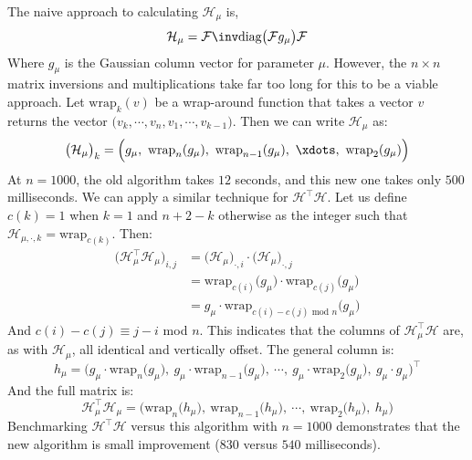 \documentclass{article}
\begin{document}
The naive approach to calculating $\mathcal H_\mu$ is,
$$\mathcal H_\mu=\mathcal F\inv\textrm{diag}\big(\mathcal Fg_\mu\big)\mathcal F$$
Where $g_\mu$ is the Gaussian column vector for parameter $\mu$. However, the $n\times n$ matrix inversions and multiplications take far too long for this to be a viable approach. Let $\textrm{wrap}_k(v)$ be a wrap-around function that takes a vector $v$ returns the vector $\big(v_k,\cdots,v_n,v_1,\cdots,v_{k-1}\big)$. Then we can write $\mathcal H_{\mu}$ as:
$$\big(\mathcal H_{\mu}\big)_k=\Big(g_\mu,\ \textrm{wrap}_n(g_\mu),\ \textrm{wrap}_{n-1}(g_\mu),\ \xdots,\ \textrm{wrap}_{2}(g_\mu)\Big)$$
At $n=1000$, the old algorithm takes $12$ seconds, and this new one takes only $500$ milliseconds. We can apply a similar technique for $\mathcal H^\top\mathcal H$. Let us define $c(k)=1$ when $k=1$ and $n+2-k$ otherwise as the integer such that $\mathcal H_{\mu,\cdot,k}=\textrm{wrap}_{c(k)}$. Then:
\begin{align*}
    \big(\mathcal H_\mu^\top\mathcal H_\mu\big)_{i,j}&=\big(\mathcal H_\mu\big)_{\cdot,i}\cdot\big(\mathcal H_\mu\big)_{\cdot,j} \\
    &=\textrm{wrap}_{c(i)}\big(g_\mu\big)\cdot\textrm{wrap}_{c(j)}\big(g_\mu\big) \\
    &=g_\mu\cdot\textrm{wrap}_{c(i)-c(j)\textrm{ mod }n}\big(g_\mu\big)
\end{align*}
And $c(i)-c(j)\equiv j-i$ mod $n$. This indicates that the columns of $\mathcal H_\mu^\top\mathcal H$ are, as with $\mathcal H_\mu$, all identical and vertically offset. The general column is:
$$h_\mu=\Big(g_\mu\cdot\textrm{wrap}_{n}\big(g_\mu\big),\ g_\mu\cdot\textrm{wrap}_{n-1}\big(g_\mu\big),\ \cdots,\ g_\mu\cdot\textrm{wrap}_2\big(g_\mu\big),\ g_\mu\cdot g_\mu\Big)^\top$$
And the full matrix is:
$$\mathcal H_\mu^\top\mathcal H_\mu=\Big(\textrm{wrap}_n\big(h_\mu\big),\ \textrm{wrap}_{n-1}\big(h_\mu\big),\ \cdots,\ \textrm{wrap}_2\big(h_\mu\big),\ h_\mu\Big)$$
Benchmarking $\mathcal H^\top\mathcal H$ versus this algorithm with $n=1000$ demonstrates that the new algorithm is small improvement ($830$ versus $540$ milliseconds).
\end{document}

